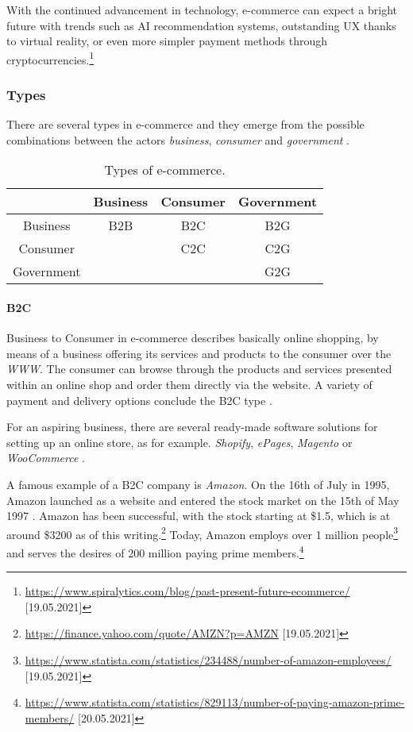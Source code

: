 With the continued advancement in technology, e-commerce can expect a bright future with trends such as AI recommendation systems, outstanding UX thanks to virtual reality, or even more simpler payment methods through cryptocurrencies.\footnote{\url{https://www.spiralytics.com/blog/past-present-future-ecommerce/} [19.05.2021]}



\subsubsection{Types}

There are several types in e-commerce and they emerge from the possible combinations between the actors \textit{business}, \textit{consumer} and \textit{government} \cite{2017DosSantos}.

\begin{table}[h]
	\centering
	\begin{tabular}{| c | c | c | c |}
	\hline
	 & Business & Consumer & Government \\
	\hline
	Business & B2B & B2C & B2G \\
	\hline
	Consumer & \cellcolor{lightgrey} & C2C & C2G \\
	\hline
	Government & \cellcolor{lightgrey} & \cellcolor{lightgrey} & G2G \\
	\hline
	\end{tabular}
	\caption{\label{tab:table-name} Types of e-commerce.}
\end{table}


\paragraph{B2C}
Business to Consumer in e-commerce describes basically online shopping, by means of a business offering its services and products to the consumer over the \textit{WWW}.
The consumer can browse through the products and services presented within an online shop and order them directly via the website.
A variety of payment and delivery options conclude the B2C type \cite{2020Heinemann}.

For an aspiring business, there are several ready-made software solutions for setting up an online store, as for example. \textit{Shopify}, \textit{ePages}, \textit{Magento} or \textit{WooCommerce} \cite{2019Steireif}.

A famous example of a B2C company is \textit{Amazon}.
On the 16th of July in 1995, Amazon launched as a website and entered the stock market on the 15th of May 1997 \cite{2019Stone}. %
Amazon has been successful, with the stock starting at \$1.5, which is at around \$3200 as of this writing.\footnote{\url{https://finance.yahoo.com/quote/AMZN?p=AMZN} [19.05.2021]}
Today, Amazon employs over 1 million people\footnote{\url{https://www.statista.com/statistics/234488/number-of-amazon-employees/} [19.05.2021]} and serves the desires of 200 million paying prime members.\footnote{\url{https://www.statista.com/statistics/829113/number-of-paying-amazon-prime-members/} [20.05.2021]}
\\

